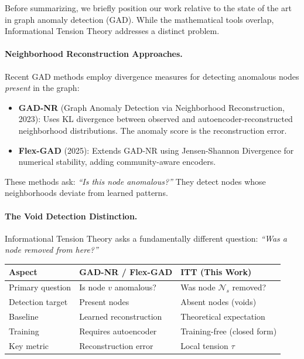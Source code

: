 \documentclass[12pt,a4paper]{article}
\theoremstyle{definition}
\theoremstyle{remark}
\newcommand{\NS}{\mathcal{N}_s}          %
\begin{document}
Before summarizing, we briefly position our work relative to the state of the art in graph anomaly detection (GAD). While the mathematical tools overlap, Informational Tension Theory addresses a distinct problem.

\paragraph{Neighborhood Reconstruction Approaches.}
Recent GAD methods employ divergence measures for detecting anomalous nodes \emph{present} in the graph:

\begin{itemize}
    \item \textbf{GAD-NR} (Graph Anomaly Detection via Neighborhood Reconstruction, 2023): Uses KL divergence between observed and autoencoder-reconstructed neighborhood distributions. The anomaly score is the reconstruction error.
    
    \item \textbf{Flex-GAD} (2025): Extends GAD-NR using Jensen-Shannon Divergence for numerical stability, adding community-aware encoders.
\end{itemize}

These methods ask: \emph{``Is this node anomalous?''} They detect nodes whose neighborhoods deviate from learned patterns.

\paragraph{The Void Detection Distinction.}
Informational Tension Theory asks a fundamentally different question: \emph{``Was a node removed from here?''}

\begin{center}
\renewcommand{\arraystretch}{1.3}
\begin{tabular}{p{3.5cm}p{4.5cm}p{4.5cm}}
\toprule
\textbf{Aspect} & \textbf{GAD-NR / Flex-GAD} & \textbf{ITT (This Work)} \\
\midrule
Primary question & Is node $v$ anomalous? & Was node $\NS$ removed? \\
Detection target & Present nodes & Absent nodes (voids) \\
Baseline & Learned reconstruction & Theoretical expectation \\
Training & Requires autoencoder & Training-free (closed form) \\
Key metric & Reconstruction error & Local tension $\tau$ \\
\bottomrule
\end{tabular}
\end{center}
\end{document}
